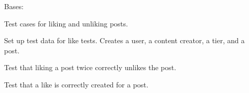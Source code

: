 \documentclass[letterpaper,10pt,english]{sphinxmanual}
\begin{document}
\begin{fulllineitems}
\label{\detokenize{modules/tests:interactions.tests.LikeTests}}
\pysigstartsignatures
{}
\pysigstopsignatures
\sphinxAtStartPar
Bases: 

\sphinxAtStartPar
Test cases for liking and unliking posts.

\begin{fulllineitems}
\label{\detokenize{modules/tests:interactions.tests.LikeTests.setUp}}
\pysigstartsignatures
{}
\pysigstopsignatures
\sphinxAtStartPar
Set up test data for like tests.
Creates a user, a content creator, a tier, and a post.

\end{fulllineitems}


\begin{fulllineitems}
\label{\detokenize{modules/tests:interactions.tests.LikeTests.test_double_like_post_view}}
\pysigstartsignatures
{}
\pysigstopsignatures
\sphinxAtStartPar
Test that liking a post twice correctly unlikes the post.

\end{fulllineitems}


\begin{fulllineitems}
\label{\detokenize{modules/tests:interactions.tests.LikeTests.test_like_creation}}
\pysigstartsignatures
{}
\pysigstopsignatures
\sphinxAtStartPar
Test that a like is correctly created for a post.


\end{fulllineitems}
\end{fulllineitems}
\end{document}
